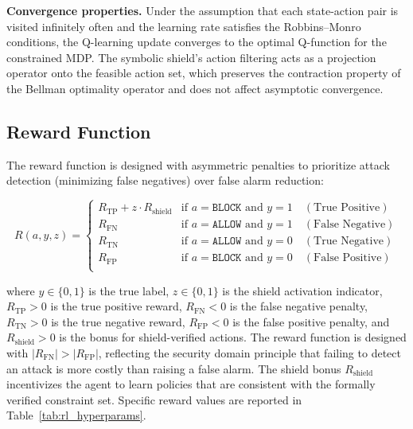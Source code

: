 \documentclass[12pt, letterpaper, oneside]{report}
\begin{document}
\textbf{Convergence properties.} Under the assumption that each state-action pair is visited infinitely often and the learning rate satisfies the Robbins--Monro conditions, the Q-learning update converges to the optimal Q-function for the constrained MDP. The symbolic shield's action filtering acts as a projection operator onto the feasible action set, which preserves the contraction property of the Bellman optimality operator and does not affect asymptotic convergence.

\subsection{Reward Function}
\label{sec:reward_function}

The reward function is designed with asymmetric penalties to prioritize attack detection (minimizing false negatives) over false alarm reduction:

\begin{equation}
\label{eq:reward}
R(a, y, z) = \begin{cases}
R_{\text{TP}} + z \cdot R_{\text{shield}} & \text{if } a = \texttt{BLOCK} \text{ and } y = 1 \quad (\text{True Positive}) \\
R_{\text{FN}} & \text{if } a = \texttt{ALLOW} \text{ and } y = 1 \quad (\text{False Negative}) \\
R_{\text{TN}} & \text{if } a = \texttt{ALLOW} \text{ and } y = 0 \quad (\text{True Negative}) \\
R_{\text{FP}} & \text{if } a = \texttt{BLOCK} \text{ and } y = 0 \quad (\text{False Positive}) \\
\end{cases}
\end{equation}

\noindent where $y \in \{0, 1\}$ is the true label, $z \in \{0, 1\}$ is the shield activation indicator, $R_{\text{TP}} > 0$ is the true positive reward, $R_{\text{FN}} < 0$ is the false negative penalty, $R_{\text{TN}} > 0$ is the true negative reward, $R_{\text{FP}} < 0$ is the false positive penalty, and $R_{\text{shield}} > 0$ is the bonus for shield-verified actions. The reward function is designed with $|R_{\text{FN}}| > |R_{\text{FP}}|$, reflecting the security domain principle that failing to detect an attack is more costly than raising a false alarm. The shield bonus $R_{\text{shield}}$ incentivizes the agent to learn policies that are consistent with the formally verified constraint set. Specific reward values are reported in Table~\ref{tab:rl_hyperparams}.
\end{document}
